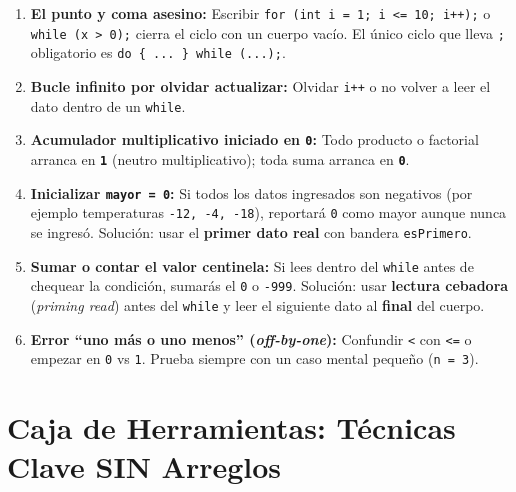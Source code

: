 \documentclass[11pt,letterpaper]{article}
\begin{document}
\begin{enumerate}
  \item \textbf{El punto y coma asesino:} Escribir \texttt{for (int i = 1; i <= 10; i++);} o \texttt{while (x > 0);} cierra el ciclo con un cuerpo vacío. El único ciclo que lleva \texttt{;} obligatorio es \texttt{do \{ ... \} while (...);}.
  \item \textbf{Bucle infinito por olvidar actualizar:} Olvidar \texttt{i++} o no volver a leer el dato dentro de un \texttt{while}.
  \item \textbf{Acumulador multiplicativo iniciado en \texttt{0}:} Todo producto o factorial arranca en \textbf{\texttt{1}} (neutro multiplicativo); toda suma arranca en \textbf{\texttt{0}}.
  \item \textbf{Inicializar \texttt{mayor = 0}:} Si todos los datos ingresados son negativos (por ejemplo temperaturas \texttt{-12, -4, -18}), reportará \texttt{0} como mayor aunque nunca se ingresó. Solución: usar el \textbf{primer dato real} con bandera \texttt{esPrimero}.
  \item \textbf{Sumar o contar el valor centinela:} Si lees dentro del \texttt{while} antes de chequear la condición, sumarás el \texttt{0} o \texttt{-999}. Solución: usar \textbf{lectura cebadora} (\emph{priming read}) antes del \texttt{while} y leer el siguiente dato al \textbf{final} del cuerpo.
  \item \textbf{Error ``uno más o uno menos'' (\emph{off-by-one}):} Confundir \texttt{<} con \texttt{<=} o empezar en \texttt{0} vs \texttt{1}. Prueba siempre con un caso mental pequeño (\texttt{n = 3}).
\end{enumerate}

\section{Caja de Herramientas: Técnicas Clave SIN Arreglos}
\end{document}
